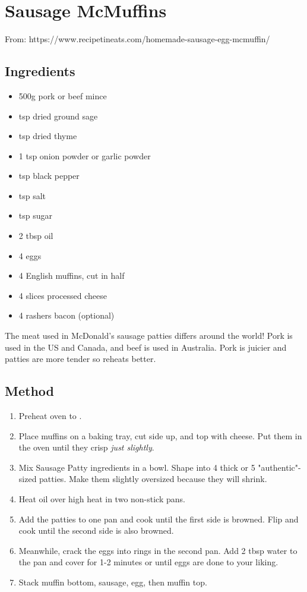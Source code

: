 \section{Sausage McMuffins}


From: https://www.recipetineats.com/homemade-sausage-egg-mcmuffin/

\subsection{Ingredients}

\begin{itemize}
	\item 500g pork or beef mince
	\item {} tsp dried ground sage
	\item {} tsp dried thyme
	\item 1 tsp onion powder or garlic powder
	\item {} tsp black pepper
	\item {} tsp salt
	\item {} tsp sugar
	\item 2 tbsp oil
	\item 4 eggs
	\item 4 English muffins, cut in half
	\item 4 slices processed cheese
	\item 4 rashers bacon (optional)
\end{itemize}

The meat used in McDonald's sausage patties differs around the world! Pork is used in the US and Canada, and beef is used in Australia. Pork is juicier and patties are more tender so reheats better.

\subsection{Method}

\begin{enumerate}
	\item Preheat oven to .
	\item Place muffins on a baking tray, cut side up, and top with cheese. Put them in the oven until they crisp \emph{just slightly}.
	\item Mix Sausage Patty ingredients in a bowl. Shape into 4 thick or 5 "authentic"-sized patties. Make them slightly oversized because they will shrink.
	\item Heat oil over high heat in two non-stick pans.
	\item Add the patties to one pan and cook until the first side is browned. Flip and cook until the second side is also browned.
	\item Meanwhile, crack the eggs into rings in the second pan. Add 2 tbsp water to the pan and cover for 1-2 minutes or until eggs are done to your liking.
	\item Stack muffin bottom, sausage, egg, then muffin top.
\end{enumerate}
